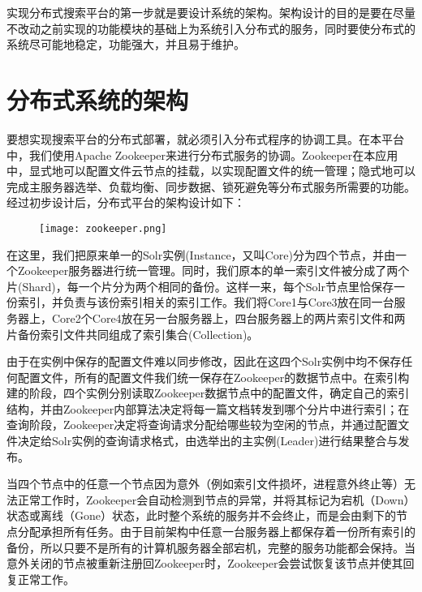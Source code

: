 实现分布式搜索平台的第一步就是要设计系统的架构。架构设计的目的是要在尽量不改动之前实现的功能模块的基础上为系统引入分布式的服务，同时要使分布式的系统尽可能地稳定，功能强大，并且易于维护。

\section{分布式系统的架构}

要想实现搜索平台的分布式部署，就必须引入分布式程序的协调工具。在本平台中，我们使用Apache Zookeeper来进行分布式服务的协调。Zookeeper在本应用中，显式地可以配置文件云节点的挂载，以实现配置文件的统一管理；隐式地可以完成主服务器选举、负载均衡、同步数据、锁死避免等分布式服务所需要的功能。经过初步设计后，分布式平台的架构设计如下：
\begin{figure}[!htp]
  \centering
  \texttt{[image: zookeeper.png]}
\end{figure}

在这里，我们把原来单一的Solr实例(Instance，又叫Core)分为四个节点，并由一个Zookeeper服务器进行统一管理。同时，我们原本的单一索引文件被分成了两个片(Shard)，每一个片分为两个相同的备份。这样一来，每个Solr节点里恰保存一份索引，并负责与该份索引相关的索引工作。我们将Core1与Core3放在同一台服务器上，Core2个Core4放在另一台服务器上，四台服务器上的两片索引文件和两片备份索引文件共同组成了索引集合(Collection)。

由于在实例中保存的配置文件难以同步修改，因此在这四个Solr实例中均不保存任何配置文件，所有的配置文件我们统一保存在Zookeeper的数据节点中。在索引构建的阶段，四个实例分别读取Zookeeper数据节点中的配置文件，确定自己的索引结构，并由Zookeeper内部算法决定将每一篇文档转发到哪个分片中进行索引；在查询阶段，Zookeeper决定将查询请求分配给哪些较为空闲的节点，并通过配置文件决定给Solr实例的查询请求格式，由选举出的主实例(Leader)进行结果整合与发布。

当四个节点中的任意一个节点因为意外（例如索引文件损坏，进程意外终止等）无法正常工作时，Zookeeper会自动检测到节点的异常，并将其标记为宕机（Down）状态或离线（Gone）状态，此时整个系统的服务并不会终止，而是会由剩下的节点分配承担所有任务。由于目前架构中任意一台服务器上都保存着一份所有索引的备份，所以只要不是所有的计算机服务器全部宕机，完整的服务功能都会保持。当意外关闭的节点被重新注册回Zookeeper时，Zookeeper会尝试恢复该节点并使其回复正常工作。

